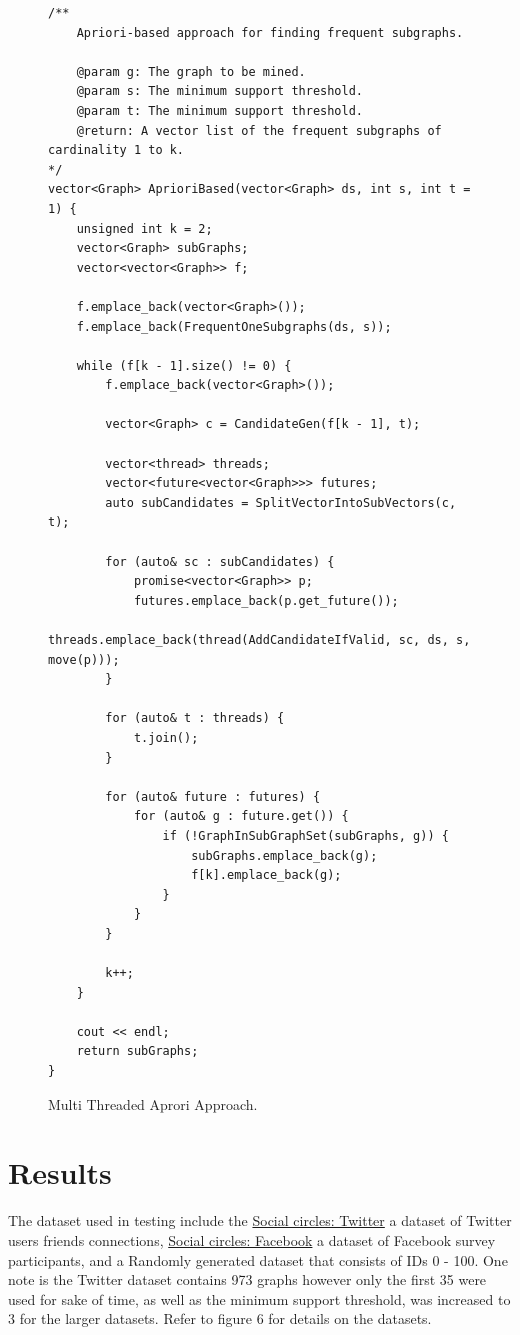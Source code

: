 \documentclass{article}
\begin{document}
\begin{figure}
\begin{lstlisting}
/**
	Apriori-based approach for finding frequent subgraphs.

	@param g: The graph to be mined.
	@param s: The minimum support threshold.
	@param t: The minimum support threshold.
	@return: A vector list of the frequent subgraphs of cardinality 1 to k.
*/
vector<Graph> AprioriBased(vector<Graph> ds, int s, int t = 1) {
	unsigned int k = 2;
	vector<Graph> subGraphs;
	vector<vector<Graph>> f;

	f.emplace_back(vector<Graph>());
	f.emplace_back(FrequentOneSubgraphs(ds, s));

	while (f[k - 1].size() != 0) {
		f.emplace_back(vector<Graph>());

		vector<Graph> c = CandidateGen(f[k - 1], t);

		vector<thread> threads;
		vector<future<vector<Graph>>> futures;
		auto subCandidates = SplitVectorIntoSubVectors(c, t);

		for (auto& sc : subCandidates) {
			promise<vector<Graph>> p;
			futures.emplace_back(p.get_future());
			threads.emplace_back(thread(AddCandidateIfValid, sc, ds, s, move(p)));
		}

		for (auto& t : threads) {
			t.join();
		}

		for (auto& future : futures) {
			for (auto& g : future.get()) {
				if (!GraphInSubGraphSet(subGraphs, g)) {
					subGraphs.emplace_back(g);
					f[k].emplace_back(g);
				}
			}
		}
		
		k++;
	}

	cout << endl;
	return subGraphs;
}
\end{lstlisting}
  \caption{Multi Threaded Aprori Approach.}
  \label{fig:Multi Threaded Aprori Approach}
\end{figure}

\pagebreak

\section{Results}

The dataset used in testing include the \href{http://snap.stanford.edu/data/ego-Twitter.html}{Social circles: Twitter} a dataset of Twitter users friends connections, \href{http://snap.stanford.edu/data/ego-Facebook.html}{Social circles: Facebook} a dataset of Facebook survey participants, and a Randomly generated dataset that consists of IDs 0 - 100. One note is the Twitter dataset contains 973 graphs however only the first 35 were used for sake of time, as well as the minimum support threshold,  was increased to 3 for the larger datasets. Refer to figure 6 for details on the datasets.
\end{document}
